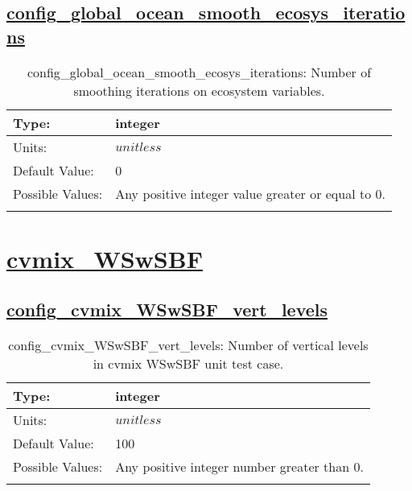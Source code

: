 \subsection[config\_global\_ocean\_smooth\_ecosys\_iterations]{\hyperref[sec:nm_tab_global_ocean]{config\_global\_ocean\_smooth\_ecosys\_iterations}}
\label{subsec:nm_sec_config_global_ocean_smooth_ecosys_iterations}
\begin{center}
\begin{longtable}{| p{2.0in} || p{4.0in} |}
    \hline
    Type: & integer \\
    \hline
    Units: & $unitless$ \\
    \hline
    Default Value: & 0 \\
    \hline
    Possible Values: & Any positive integer value greater or equal to 0. \\
    \hline
    \caption{config\_global\_ocean\_smooth\_ecosys\_iterations: Number of smoothing iterations on ecosystem variables.}
\end{longtable}
\end{center}
\section[cvmix\_WSwSBF]{\hyperref[sec:nm_tab_cvmix_WSwSBF]{cvmix\_WSwSBF}}
\label{sec:nm_sec_cvmix_WSwSBF}
\subsection[config\_cvmix\_WSwSBF\_vert\_levels]{\hyperref[sec:nm_tab_cvmix_WSwSBF]{config\_cvmix\_WSwSBF\_vert\_levels}}
\label{subsec:nm_sec_config_cvmix_WSwSBF_vert_levels}
\begin{center}
\begin{longtable}{| p{2.0in} || p{4.0in} |}
    \hline
    Type: & integer \\
    \hline
    Units: & $unitless$ \\
    \hline
    Default Value: & 100 \\
    \hline
    Possible Values: & Any positive integer number greater than 0. \\
    \hline
    \caption{config\_cvmix\_WSwSBF\_vert\_levels: Number of vertical levels in cvmix WSwSBF unit test case.}
\end{longtable}
\end{center}
